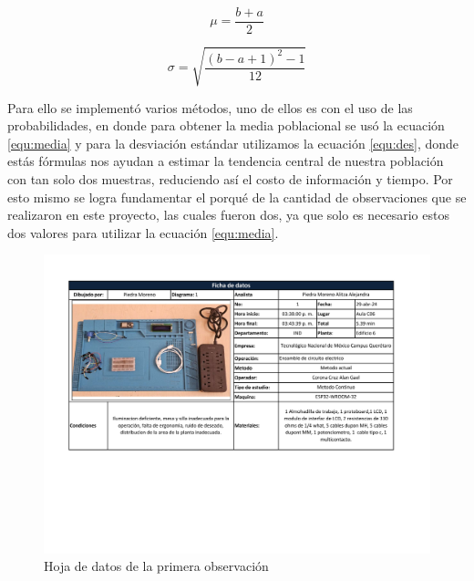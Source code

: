      \begin{equation}
            \label{equ:media}
           \mu = \dfrac{b+a}{2}
        \end{equation}
    
      \begin{equation}
            \label{equ:des}
            \sigma = \sqrt{\dfrac{(b-a+1)^2-1}{12}}
        \end{equation}
    
    
    
    Para ello se implementó varios métodos, uno de ellos es con el uso de las probabilidades, en donde para obtener la media poblacional se usó la ecuación \ref{equ:media} y para  la desviación estándar utilizamos la ecuación \ref{equ:des}, donde estás fórmulas nos ayudan a estimar la tendencia central de nuestra población con tan solo dos muestras, reduciendo así el costo de información y tiempo. Por esto mismo se logra fundamentar el porqué de la cantidad de observaciones que se realizaron en este proyecto, las cuales fueron dos, ya que solo es necesario estos dos valores para utilizar la ecuación \ref{equ:media}.
       
    \begin{figure}[H]
        \centering
        \includegraphics[trim = {17mm 70mm 25mm 15mm},clip,scale=0.37]{22/Img/hojaDeDatos1.pdf}
        \caption{Hoja de datos de la primera observación}
        \label{fig:hoja1}
    \end{figure}
    
